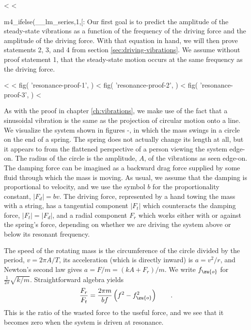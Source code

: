 <%
<%


m4_ifelse(__lm_series,1,[:
Our first goal is to predict the amplitude of the steady-state
vibrations as a function of the frequency of the driving
force and the amplitude of the driving force. With that
equation in hand, we will then prove statements 2, 3, and 4
from  section \ref{sec:driving-vibrations}. We assume without proof statement
1, that the steady-state motion occurs at the same frequency
as the driving force.

<%
<%
  fig(
    'resonance-proof-1',
  )
\spacebetweenfigs
<%
  fig(
    'resonance-proof-2',
  )
\spacebetweenfigs
<%
  fig(
    'resonance-proof-3',
  )
<%

As with the proof in chapter \ref{ch:vibrations}, we make use of
the fact that a sinusoidal vibration is the same as the
projection of circular motion onto a line. We visualize the
system shown in figures -, in which the mass swings in a
circle on the end of a spring. The spring does not actually
change its length at all, but it appears to from the
flattened perspective of a person viewing the system
edge-on. The radius of the circle is the amplitude, $A$, of
the vibrations as seen edge-on. The damping force can be
imagined as a backward drag force supplied by some fluid
through which the mass is moving. As usual, we assume that
the damping is proportional to velocity, and we use the
symbol $b$ for the proportionality constant, $|F_d|=bv$.
The driving force, represented by a hand towing the mass
with a string, has a tangential component $|F_t|$ which
counteracts the damping force, $|F_t|=|F_d|$, and a radial
component $F_r$ which works either with or against the
spring's force, depending on whether we are driving the
system above or below its resonant frequency.

The speed of the rotating mass is the circumference of the
circle divided by the period, $v=2\pi A/T$, its acceleration
(which is directly inward) is $a=v^2/r$, and Newton's second
law gives $a=F/m=(kA+F_r)/m$. We write $f_\zu{o}$ for
$\frac{1}{2\pi}\sqrt{k/m}$. Straightforward algebra yields
\begin{equation}
 \frac{F_r}{F_t} = \frac{2\pi m}{bf}\left(f^2-f_\zu{o}^2\right) \qquad .
\end{equation}
This is the ratio of the wasted force to the useful force,
and we see that it becomes zero when the system is
driven at resonance.


